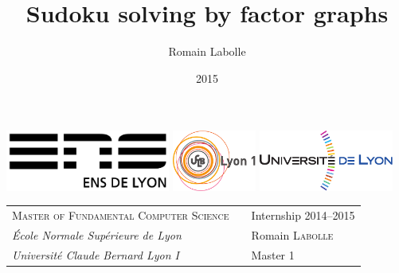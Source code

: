 \documentclass[a4paper,11pt]{report}
\title{Sudoku solving by factor graphs}
\author{Romain Labolle}
\date{2015}
\begin{document}
\thispagestyle{empty}

\includegraphics[height=2cm]{logos/ens.pdf} \hfill
\includegraphics[height=2cm]{logos/ucbl.pdf} \hfill
\includegraphics[height=2cm]{logos/univlyon.pdf}

\vspace{0.5cm}

\begin{tabularx}{\textwidth}{@{} l X l @{} }
\textsc{Master of Fundamental Computer Science} & & Internship 2014--2015 \\
\textit{École Normale Supérieure de Lyon} & & Romain \textsc{Labolle} \\
\textit{Université Claude Bernard Lyon I} & & Master 1
\end{tabularx}
\end{document}
